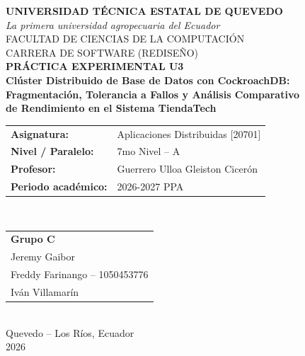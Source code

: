 \documentclass[10pt,letterpaper]{article}
\begin{document}
\begin{titlepage}
\begin{center}
{\large \textbf{UNIVERSIDAD TÉCNICA ESTATAL DE QUEVEDO}}\\[2pt]
{\normalsize \textit{La primera universidad agropecuaria del Ecuador}}\\[4pt]
{\large FACULTAD DE CIENCIAS DE LA COMPUTACIÓN}\\[2pt]
{\normalsize CARRERA DE SOFTWARE (REDISEÑO)}\\[30pt]

{\Huge \textbf{PRÁCTICA EXPERIMENTAL U3}}\\[10pt]
{\LARGE \textbf{Clúster Distribuido de Base de Datos con CockroachDB:\\
Fragmentación, Tolerancia a Fallos y Análisis Comparativo\\
de Rendimiento en el Sistema TiendaTech}}\\[30pt]

\begin{tabular}{ll}
\textbf{Asignatura:} & Aplicaciones Distribuidas [20701]\\
\textbf{Nivel / Paralelo:} & 7mo Nivel -- A\\
\textbf{Profesor:} & Guerrero Ulloa Gleiston Cicerón\\
\textbf{Periodo académico:} & 2026-2027 PPA\\
\end{tabular}\\[25pt]

\begin{tabular}{l}
\textbf{Grupo C}\\[4pt]
Jeremy Gaibor\\
Freddy Farinango -- 1050453776\\
Iván Villamarín\\
\end{tabular}\\[35pt]

Quevedo -- Los Ríos, Ecuador\\
2026
\end{center}
\end{titlepage}
\end{document}
